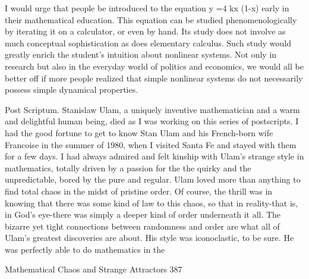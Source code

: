           I would urge that people be introduced to the equation y =4 kx (1-x)
   early in their mathematical education. This equation can be studied
   phenomenologically by iterating it on a calculator, or even by hand. Its study
   does not involve as much conceptual sophistication as does elementary calculus.
   Such study would greatly enrich the student's intuition about nonlinear systems.
          Not only in research but also in the everyday world of politics and
   economics, we would all be better off if more people realized that simple
   nonlinear systems do not necessarily possess simple dynamical properties.

Post Scriptum.
Stanislaw Ulam, a uniquely inventive mathematician and a warm and delightful
human being, died as I was working on this series of postscripts. I had the good
fortune to get to know Stan Ulam and his French-born wife Francoise in the summer
of 1980, when I visited Santa Fe and stayed with them for a few days. I had always
admired and felt kinship with Ulam's strange style in mathematics, totally driven by a
passion for the the quirky and the unpredictable, bored by the pure and regular. Ulam
loved more than anything to find total chaos in the midst of pristine order. Of course,
the thrill was in knowing that there was some kind of law to this chaos, so that in
reality-that is, in God's eye-there was simply a deeper kind of order underneath it all.
The bizarre yet tight connections between randomness and order are what all of
Ulam's greatest discoveries are about. His style was iconoclastic, to be sure. He was
perfectly able to do mathematics in the




Mathematical Chaos and Strange Attractors                                            387

